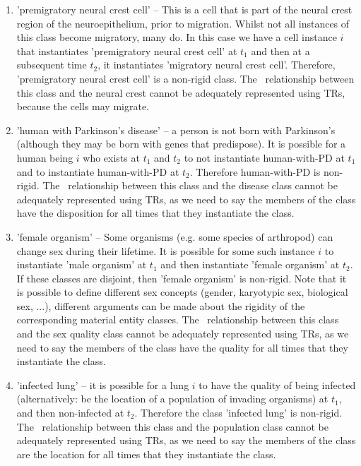 \documentclass{bioinfo}
\def\partOf{\pr{part\_of}}
\begin{document}
\begin{enumerate}

\item 'premigratory neural crest cell' -- This is a cell that is part
  of the neural crest region of the neuroepithelium, prior to
  migration. Whilst not all instances of this class become migratory,
  many do. In this case we have a cell instance $i$ that instantiates
  'premigratory neural crest cell' at $t_1$ and then at a subsequent
  time $t_2$, it instantiates 'migratory neural crest
  cell'. Therefore, 'premigratory neural crest cell' is a non-rigid
  class. The \partOf\ relationship between this class and the neural
  crest cannot be adequately represented using TRs, because the cells
  may migrate.

\item 'human with Parkinson's disease' -- a person is not born with
  Parkinson's (although they may be born with genes that
  predispose). It is possible for a human being $i$ who exists at
  $t_1$ and $t_2$ to not instantiate human-with-PD at $t_1$ and to
  instantiate human-with-PD at $t_2$. Therefore human-with-PD is
  non-rigid. The \ relationship between this class
  and the disease class cannot be adequately represented using TRs, as
  we need to say the members of the class have the disposition for all
  times that they instantiate the class.

\item 'female organism' -- Some organisms (e.g. some species of
  arthropod) can change sex during their lifetime. It is possible for
  some such instance $i$ to instantiate 'male organism' at $t_1$ and
  then instantiate 'female organism' at $t_2$. If these classes are
  disjoint, then 'female organism' is non-rigid. Note that it is
  possible to define different sex concepts (gender, karyotypic sex,
  biological sex, ...), different arguments can be made about the
  rigidity of the corresponding material entity classes.  The
  \ relationship between this class and the sex
  quality class cannot be adequately represented using TRs, as we need
  to say the members of the class have the quality for all times
  that they instantiate the class.


\item 'infected lung' -- it is possible for a lung $i$ to have the
  quality of being infected (alternatively: be the location of a
  population of invading organisms) at $t_1$, and then non-infected at
  $t_2$. Therefore the class 'infected lung' is non-rigid.  The
  \ relationship between this class and the population
  class cannot be adequately represented using TRs, as we need to say
  the members of the class are the location for all times that they
  instantiate the class.



\end{enumerate}
\end{document}
